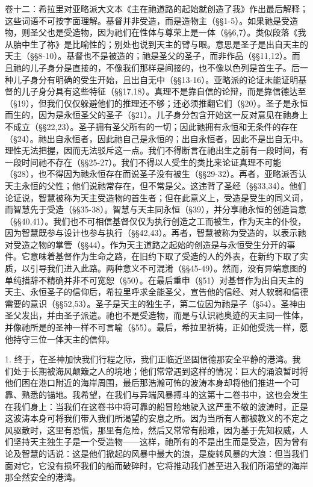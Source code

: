 卷十二：希拉里对亚略派大文本《主在祂道路的起始就创造了我》作出最后解释；这些词语不可按字面理解。基督并非受造，而是造物主（§§1-5）。如果祂是受造物，则圣父也是受造物，因为祂们在性体与尊荣上是一体（§§6,7）。类似段落《我从胎中生了祢》是比喻性的；别处也说到天主的臂与眼。意思是圣子是出自天主的天主（§§8-10）。基督也不是被造的；祂是圣父的圣子，而非作品（§§11,12）。而且祂的儿子身分是直接的，不像我们那样是间接的，也不像以色列是首生子。后一种儿子身分有明确的受生开始，且出自无中（§§13-16）。亚略派的论证未能证明基督的儿子身分具有这些特征（§§17,18）。真理不是靠自信的论辩，而是靠信德达至（§19），但我们仅仅躲避他们的推理还不够；还必须推翻它们（§20）。圣子是永恒而生的，因为是永恒圣父的圣子（§21）。儿子身分包含开始这一反对意见在祂身上不成立（§§22,23）。圣子拥有圣父所有的一切；因此祂拥有永恒和无条件的存在（§24）。祂出自永恒者，因此祂自己是永恒的；出自永恒者，因此不是出自无中。理性无法把握，因而无法驳斥这一点。我们不得断言在祂出生之前有一段时间，有一段时间祂不存在（§§25-27）。我们不得以人受生的类比来论证真理不可能（§28），也不得因为祂永恒存在而说圣子没有被生（§§29-32）。再者，亚略派否认天主永恒的父性；他们说祂常存在，但不常是父。这违背了圣经（§§33,34）。他们论证说，智慧被称为天主受造物的首生者；但在此意义上，受造是受生的同义词，而智慧先于受造（§§35-38）。智慧与天主同永恒（§39），并分享祂永恒的创造旨意（§§40,41）。我们也不可相信基督仅仅为执行创造之工而被生，作为天主的仆役，因为智慧既参与设计也参与执行（§§42,43）。再者，智慧被称为受造的，以表示祂对受造之物的掌管（§§44）。作为天主道路之起始的创造是与永恒受生分开的事件。它意味着基督作为生命之路，在旧约下取了受造的人的外表，在新约下取了实质，以引导我们进入此路。两种意义不可混淆（§§45-49）。然而，没有异端意图的单纯措辞不精确并非不可宽恕（§50）。在最后重申（§51）对基督作为出自天主的天主、永恒圣子的信仰后，希拉里呼求全能圣父，宣告他的信经、对人软弱和信德需要的意识（§§52,53）。圣子是天主的独生子，第二位因为祂是子（§54）。圣神由圣父发出，并由圣子派遣。祂也不是受造物，而是与认识祂奥迹的天主同一性体，并像祂所是的圣神一样不可言喻（§55）。最后，希拉里祈祷，正如他受洗一样，愿他持守三位一体天主的信仰。\par

1. 终于，在圣神加快我们行程之际，我们正临近坚固信德那安全平静的港湾。我们处于长期被海风颠簸之人的境地；他们常常遇到这样的情况：巨大的涌浪暂时将他们困在港口附近的海岸周围，最后那浩瀚可怖的波涛本身却将他们推进一个可靠、熟悉的锚地。我希望，在我们与异端风暴搏斗的这第十二卷书中，这也会发生在我们身上：当我们在这卷书中将可靠的船冒险地驶入这严重不敬的波涛时，正是这波涛本身可将我们带入我们所渴望的安息之所。因为当所有人都被教义的不定之风驱散时，这里有恐慌，那里有危险，然后又常常有船难，因为基于先知权威，人们坚持天主独生子是一个受造物——这样，祂所有的不是出生而是受造，因为曾有论及智慧的话说：这是他们掀起的风暴中最大的浪，是旋转风暴的大浪：但当我们面对它，它没有损坏我们的船而破碎时，它将推动我们甚至进入我们所渴望的海岸那全然安全的港湾。\par


